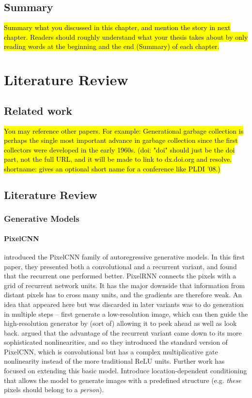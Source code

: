 \documentclass[11pt, a4paper]{book}
\begin{document}
\section{Summary}
\hl{Summary what you discussed in this chapter, and mention the story in next
chapter. Readers should roughly understand what your thesis takes about by only reading
words at the beginning and the end (Summary) of each chapter.}


\chapter{Literature Review}

\section{Related work}
\label{sec:relatedwork}
\hl{You may reference other papers. For example: 
Generational garbage collection is perhaps the
single most important advance in garbage collection since the first collectors
were developed in the early 1960s. (doi: "doi" should just be the doi part, not
the full URL, and it will be made to link to dx.doi.org and resolve.
shortname: gives an optional short name for a conference like PLDI '08.)}

\section{Literature Review}

\subsection{Generative Models}

\subsubsection{PixelCNN}
\citet{pixelcnn1} introduced the PixelCNN family of autoregressive generative models. In this first paper, they presented both a convolutional and a recurrent variant, and found that the recurrent one performed better. PixelRNN connects the pixels with a grid of recurrent network units. It has the major downside that information from distant pixels has to cross many units, and the gradients are therefore weak. An idea that appeared here but was discarded in later variants was to do generation in multiple steps -- first generate a low-resolution image, which can then guide the high-resolution generator by (sort of) allowing it to peek ahead as well as look back. \citet{pixelcnn2} argued that the advantage of the recurrent variant came down to its more sophisticated nonlinearities, and so they introduced the standard version of PixelCNN, which is convolutional but has a complex multiplicative gate nonlinearity instead of the more traditional ReLU units. Further work has focused on extending this basic model. \citet{pixelcnn3} Introduce location-dependent conditioning that allows the model to generate images with a predefined structure (e.g. \emph{these} pixels should belong to a \emph{person}).
\end{document}
